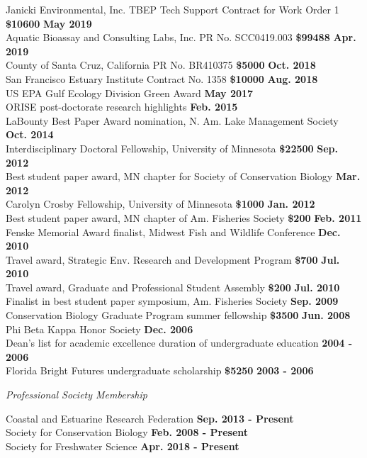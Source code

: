 \documentclass[letterpaper,12pt]{article}
\newcommand{\sectitle}[1]{\vspace{\baselineskip} \centerline{\large{\textit{#1}}}}
\begin{document}
Janicki Environmental, Inc. TBEP Tech Support Contract for Work Order 1 {\bf \$10600} \hfill {\bf May 2019} \\
Aquatic Bioassay and Consulting Labs, Inc. PR No. SCC0419.003 {\bf \$99488} \hfill {\bf Apr. 2019} \\
County of Santa Cruz, California PR No. BR410375 {\bf \$5000} \hfill {\bf Oct. 2018} \\
San Francisco Estuary Institute Contract No. 1358 {\bf \$10000} \hfill {\bf Aug. 2018} \\
US EPA Gulf Ecology Division Green Award \hfill {\bf May 2017} \\
ORISE post-doctorate research highlights \hfill {\bf Feb. 2015} \\
LaBounty Best Paper Award nomination, N. Am. Lake Management Society \hfill {\bf Oct. 2014} \\
Interdisciplinary Doctoral Fellowship, University of Minnesota {\bf \$22500} \hfill {\bf Sep. 2012} \\
Best student paper award, MN chapter for Society of Conservation Biology \hfill {\bf Mar. 2012} \\
Carolyn Crosby Fellowship, University of Minnesota {\bf \$1000} \hfill {\bf Jan. 2012} \\
Best student paper award, MN chapter of Am. Fisheries Society {\bf \$200} \hfill {\bf Feb. 2011} \\
Fenske Memorial Award finalist, Midwest Fish and Wildlife Conference \hfill {\bf Dec. 2010} \\
Travel award, Strategic Env. Research and Development Program {\bf \$700} \hfill {\bf Jul. 2010} \\
Travel award, Graduate and Professional Student Assembly {\bf \$200} \hfill {\bf Jul. 2010} \\
Finalist in best student paper symposium, Am. Fisheries Society \hfill {\bf Sep. 2009} \\
Conservation Biology Graduate Program summer fellowship {\bf \$3500} \hfill {\bf Jun. 2008} \\
Phi Beta Kappa Honor Society \hfill {\bf Dec. 2006} \\
Dean's list for academic excellence duration of undergraduate education \hfill {\bf 2004 - 2006} \\
Florida Bright Futures undergraduate scholarship {\bf \$5250} \hfill {\bf 2003 - 2006} 

\sectitle{Professional Society Membership}

Coastal and Estuarine Research Federation \hfill {\bf Sep. 2013 - Present} \\
Society for Conservation Biology \hfill {\bf Feb. 2008 - Present} \\
Society for Freshwater Science \hfill {\bf Apr. 2018 - Present}
\end{document}
